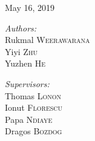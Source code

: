 \begin{titlepage}
\begin{center}
{\large May 16, 2019} %



\vspace{\fill}


\begin{minipage}{0.4\textwidth}
\begin{flushleft} \large
\emph{Authors:}\\
\Large
Rukmal \textsc{Weerawarana} \\
Yiyi \textsc{Zhu} \\
Yuzhen \textsc{He}
\end{flushleft}
\end{minipage}
\hfill
\begin{minipage}{0.4\textwidth}
\begin{flushright} \large
\emph{Supervisors:} \\
\Large
Thomas \textsc{Lonon} \\
Ionut \textsc{Florescu} \\
Papa \textsc{Ndiaye} \\
Dragos \textsc{Bozdog}
\end{flushright}
\end{minipage}

\end{center}
\thispagestyle{empty}
\end{titlepage}